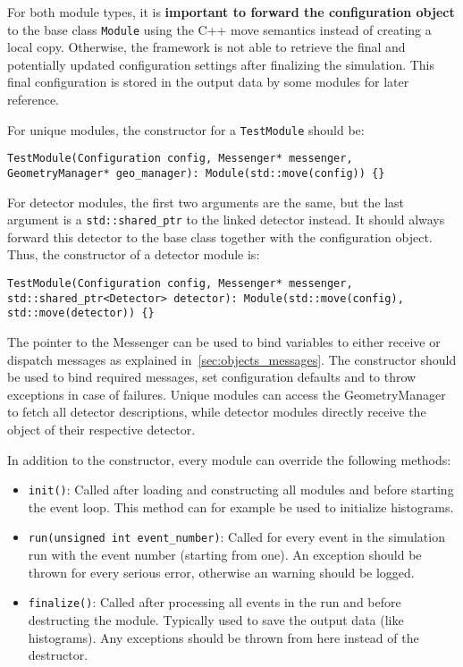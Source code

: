\begin{warning}
For both module types, it is \textbf{important to forward the configuration object} to the base class \texttt{Module} using the C++ move semantics instead of creating a local copy.
Otherwise, the framework is not able to retrieve the final and potentially updated configuration settings after finalizing the simulation.
This final configuration is stored in the output data by some modules for later reference.
\end{warning}

For unique modules, the constructor for a \texttt{TestModule} should be:
\begin{verbatim}
TestModule(Configuration config, Messenger* messenger, GeometryManager* geo_manager): Module(std::move(config)) {}
\end{verbatim}

For detector modules, the first two arguments are the same, but the last argument is a \texttt{std::shared\_ptr} to the linked detector instead.
It should always forward this detector to the base class together with the configuration object.
Thus, the constructor of a detector module is:
\begin{verbatim}
TestModule(Configuration config, Messenger* messenger, std::shared_ptr<Detector> detector): Module(std::move(config), std::move(detector)) {}
\end{verbatim}

The pointer to the Messenger can be used to bind variables to either receive or dispatch messages as explained in~\ref{sec:objects_messages}.
The constructor should be used to bind required messages, set configuration defaults and to throw exceptions in case of failures.
Unique modules can access the GeometryManager to fetch all detector descriptions, while detector modules directly receive the object of their respective detector.

In addition to the constructor, every module can override the following methods:
\begin{itemize}
\item \texttt{init()}: Called after loading and constructing all modules and before starting the event loop.
This method can for example be used to initialize histograms.
\item \texttt{run(unsigned int event\_number)}: Called for every event in the simulation run with the event number (starting from one).
An exception should be thrown for every serious error, otherwise an warning should be logged.
\item \texttt{finalize()}: Called after processing all events in the run and before destructing the module.
Typically used to save the output data (like histograms).
Any exceptions should be thrown from here instead of the destructor.
\end{itemize}

